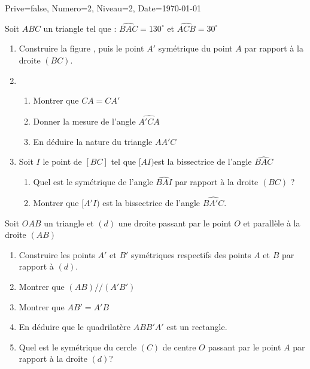 \documentclass[a4paper,12pt]{article}
\begin{document}
\begin{Maquette}[DM]{Prive=false, Numero=2, Niveau=2, Date=\today}
\begin{exercice}
\begin{minipage}{.5\textwidth}
\begin{tikzpicture}
\end{tikzpicture}
\end{minipage}
\end{exercice}

\begin{exercice}
Soit $ABC$ un triangle tel que : $\widehat{BAC}=130^{\circ}$ et $\widehat{ACB}=30^{\circ}$
\begin{enumerate}
\item Construire la figure , puis le point $A'$ symétrique du point $A$ par rapport à la droite $(BC)$.
\item
	\begin{enumerate}
	\item Montrer que $CA=CA'$
	\item Donner la mesure de l'angle $\widehat{A'CA}$
	\item En déduire la nature du triangle $AA'C$
	\end{enumerate}
\item Soit $I$ le point de $[BC]$ tel que $[AI)$est  la bissectrice de l'angle $\widehat{BAC}$
		\begin{enumerate}
		\item Quel est le symétrique de l'angle $\widehat{BAI}$ par rapport à la droite $(BC)$ ?
		\item Montrer que $[A'I)$ est la bissectrice de l'angle $\widehat{BA'C}$.
		\end{enumerate}	
\end{enumerate}
\end{exercice}

\begin{exercice}
Soit $OAB$ un triangle et $(d)$ une droite passant par le point $O$ et parallèle à la droite $(AB)$
\begin{enumerate}
\item Construire les points $A'$ et $B'$ symétriques respectifs des points $A$ et $B$ par rapport à $(d)$.
\item Montrer que $(AB)//(A'B')$
\item Montrer que $AB'=A'B$
\item En déduire que le quadrilatère $ABB'A'$ est un rectangle.
\item Quel est le symétrique du cercle $(C)$ de centre $O$ passant par le point $A$ par rapport à la droite $(d)$?
\end{enumerate}
\end{exercice}


\end{Maquette}
\end{document}
